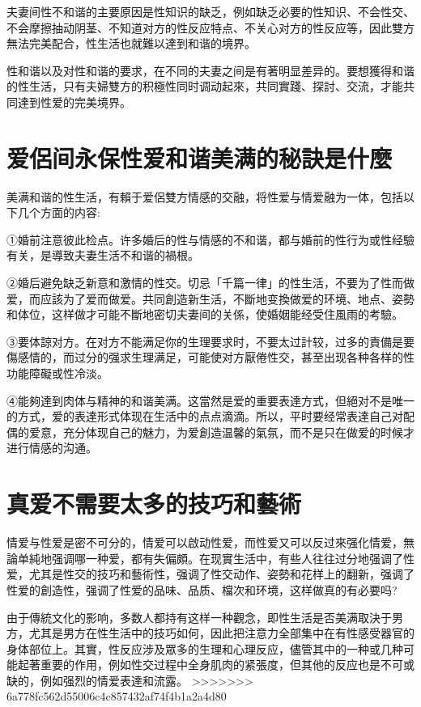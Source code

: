 \documentclass[12pt,UTF8]{ctexbook}
\begin{document}
夫妻间性不和谐的主要原因是性知识的缺乏，例如缺乏必要的性知识、不会性交、不会摩擦抽动阴茎、不知道对方的性反应特点、不关心对方的性反应等，因此雙方無法完美配合，性生活也就難以達到和谐的境界。

性和谐以及对性和谐的要求，在不同的夫妻之间是有著明显差异的。要想獲得和谐的性生活，只有夫婦雙方的积極性同时调动起來，共同實踐、探討、交流，才能共同達到性爱的完美境界。

\section{爱侶间永保性爱和谐美满的秘訣是什麼}

美满和谐的性生活，有賴于爱侶雙方情感的交融，将性爱与情爱融为一体，包括以下几个方面的内容:

①婚前注意彼此检点。许多婚后的性与情感的不和谐，都与婚前的性行为或性经驗有关，是導致夫妻生活不和谐的禍根。

②婚后避免缺乏新意和激情的性交。切忌「千篇一律」的性生活，不要为了性而做爱，而应該为了爱而做爱。共同創造新生活，不斷地变換做爱的环境、地点、姿勢和体位，这样做才可能不斷地密切夫妻间的关係，使婚姻能经受住風雨的考驗。

③要体諒对方。在对方不能满足你的生理要求时，不要太过計较，过多的責備是要傷感情的，而过分的强求生理满足，可能使对方厭倦性交，甚至出现各种各样的性功能障礙或性冷淡。

④能夠達到肉体与精神的和谐美满。这當然是爱的重要表達方式，但絕对不是唯一的方式，爱的表達形式体现在生活中的点点滴滴。所以，平时要经常表達自己对配偶的爱意，充分体现自己的魅力，为爱創造温馨的氣氛，而不是只在做爱的时候才进行情感的沟通。

\section{真爱不需要太多的技巧和藝術}

情爱与性爱是密不可分的，情爱可以啟动性爱，而性爱又可以反过來强化情爱，無論单純地强调哪一种爱，都有失偏頗。在现實生活中，有些人往往过分地强调了性爱，尤其是性交的技巧和藝術性，强调了性交动作、姿勢和花样上的翻新，强调了性爱的創造性，强调了性爱的品味、品质、檔次和环境，这样做真的有必要吗?

由于傳統文化的影响，多数人都持有这样一种觀念，即性生活是否美满取決于男方，尤其是男方在性生活中的技巧如何，因此把注意力全部集中在有性感受器官的身体部位上。其實，性反应涉及眾多的生理和心理反应，儘管其中的一种或几种可能起著重要的作用，例如性交过程中全身肌肉的紧張度，但其他的反应也是不可或缺的，例如强烈的情爱表達和流露。
>>>>>>> 6a778fc562d55006c4c857432af74f4b1a2a4d80
\end{document}
